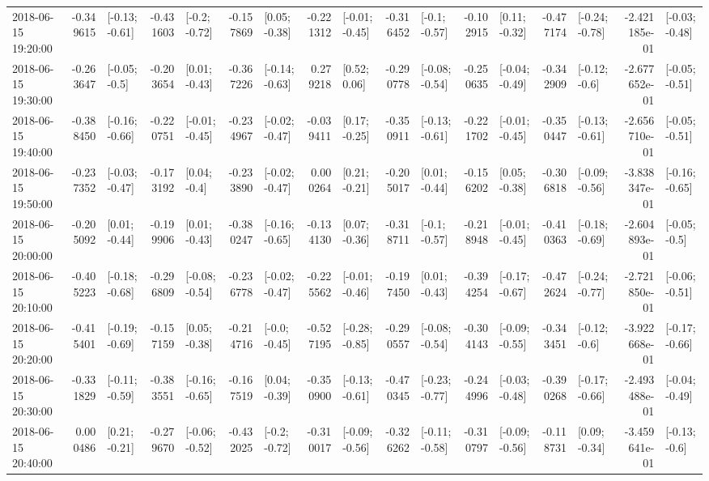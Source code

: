 \begin{tabular}{lrlrlrlrlrlrlrlrl}
2018-06-15 19:20:00 & -0.349615 &  [-0.13; -0.61] & -0.431603 &   [-0.2; -0.72] & -0.157869 &   [0.05; -0.38] & -0.221312 &  [-0.01; -0.45] & -0.316452 &   [-0.1; -0.57] & -0.102915 &   [0.11; -0.32] & -0.477174 &  [-0.24; -0.78] & -2.421185e-01 &  [-0.03; -0.48] \\
2018-06-15 19:30:00 & -0.263647 &   [-0.05; -0.5] & -0.203654 &   [0.01; -0.43] & -0.367226 &  [-0.14; -0.63] &  0.279218 &    [0.52; 0.06] & -0.290778 &  [-0.08; -0.54] & -0.250635 &  [-0.04; -0.49] & -0.342909 &   [-0.12; -0.6] & -2.677652e-01 &  [-0.05; -0.51] \\
2018-06-15 19:40:00 & -0.388450 &  [-0.16; -0.66] & -0.220751 &  [-0.01; -0.45] & -0.234967 &  [-0.02; -0.47] & -0.039411 &   [0.17; -0.25] & -0.350911 &  [-0.13; -0.61] & -0.221702 &  [-0.01; -0.45] & -0.350447 &  [-0.13; -0.61] & -2.656710e-01 &  [-0.05; -0.51] \\
2018-06-15 19:50:00 & -0.237352 &  [-0.03; -0.47] & -0.173192 &    [0.04; -0.4] & -0.233890 &  [-0.02; -0.47] &  0.000264 &   [0.21; -0.21] & -0.205017 &   [0.01; -0.44] & -0.156202 &   [0.05; -0.38] & -0.306818 &  [-0.09; -0.56] & -3.838347e-01 &  [-0.16; -0.65] \\
2018-06-15 20:00:00 & -0.205092 &   [0.01; -0.44] & -0.199906 &   [0.01; -0.43] & -0.380247 &  [-0.16; -0.65] & -0.134130 &   [0.07; -0.36] & -0.318711 &   [-0.1; -0.57] & -0.218948 &  [-0.01; -0.45] & -0.410363 &  [-0.18; -0.69] & -2.604893e-01 &   [-0.05; -0.5] \\
2018-06-15 20:10:00 & -0.405223 &  [-0.18; -0.68] & -0.296809 &  [-0.08; -0.54] & -0.236778 &  [-0.02; -0.47] & -0.225562 &  [-0.01; -0.46] & -0.197450 &   [0.01; -0.43] & -0.394254 &  [-0.17; -0.67] & -0.472624 &  [-0.24; -0.77] & -2.721850e-01 &  [-0.06; -0.51] \\
2018-06-15 20:20:00 & -0.415401 &  [-0.19; -0.69] & -0.157159 &   [0.05; -0.38] & -0.214716 &   [-0.0; -0.45] & -0.527195 &  [-0.28; -0.85] & -0.290557 &  [-0.08; -0.54] & -0.304143 &  [-0.09; -0.55] & -0.343451 &   [-0.12; -0.6] & -3.922668e-01 &  [-0.17; -0.66] \\
2018-06-15 20:30:00 & -0.331829 &  [-0.11; -0.59] & -0.383551 &  [-0.16; -0.65] & -0.167519 &   [0.04; -0.39] & -0.350900 &  [-0.13; -0.61] & -0.470345 &  [-0.23; -0.77] & -0.244996 &  [-0.03; -0.48] & -0.390268 &  [-0.17; -0.66] & -2.493488e-01 &  [-0.04; -0.49] \\
2018-06-15 20:40:00 &  0.000486 &   [0.21; -0.21] & -0.279670 &  [-0.06; -0.52] & -0.432025 &   [-0.2; -0.72] & -0.310017 &  [-0.09; -0.56] & -0.326262 &  [-0.11; -0.58] & -0.310797 &  [-0.09; -0.56] & -0.118731 &   [0.09; -0.34] & -3.459641e-01 &   [-0.13; -0.6] \\

\end{tabular}
